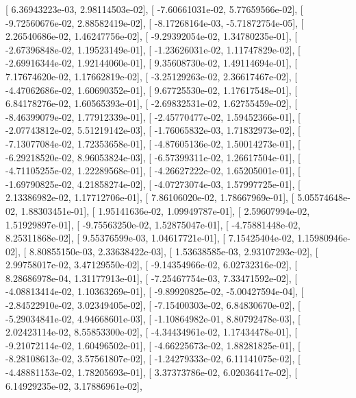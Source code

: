 \documentclass{article}
\begin{document}
       [  6.36943223e-03,   2.98114503e-02],
       [ -7.60661031e-02,   5.77659566e-02],
       [ -9.72560676e-02,   2.88582419e-02],
       [ -8.17268164e-03,  -5.71872754e-05],
       [  2.26540686e-02,   1.46247756e-02],
       [ -9.29392054e-02,   1.34780235e-01],
       [ -2.67396848e-02,   1.19523149e-01],
       [ -1.23626031e-02,   1.11747829e-02],
       [ -2.69916344e-02,   1.92144060e-01],
       [  9.35608730e-02,   1.49114694e-01],
       [  7.17674620e-02,   1.17662819e-02],
       [ -3.25129263e-02,   2.36617467e-02],
       [ -4.47062686e-02,   1.60690352e-01],
       [  9.67725530e-02,   1.17617548e-01],
       [  6.84178276e-02,   1.60565393e-01],
       [ -2.69832531e-02,   1.62755459e-02],
       [ -8.46399079e-02,   1.77912339e-01],
       [ -2.45770477e-02,   1.59452366e-01],
       [ -2.07743812e-02,   5.51219142e-03],
       [ -1.76065832e-03,   1.71832973e-02],
       [ -7.13077084e-02,   1.72353658e-01],
       [ -4.87605136e-02,   1.50014273e-01],
       [ -6.29218520e-02,   8.96053824e-03],
       [ -6.57399311e-02,   1.26617504e-01],
       [ -4.71105255e-02,   1.22289568e-01],
       [ -4.26627222e-02,   1.65205001e-01],
       [ -1.69790825e-02,   4.21858274e-02],
       [ -4.07273074e-03,   1.57997725e-01],
       [  2.13386982e-02,   1.17712706e-01],
       [  7.86106020e-02,   1.78667969e-01],
       [  5.05574648e-02,   1.88303451e-01],
       [  1.95141636e-02,   1.09949787e-01],
       [  2.59607994e-02,   1.51929897e-01],
       [ -9.75563250e-02,   1.52875047e-01],
       [ -4.75881448e-02,   8.25311868e-02],
       [  9.55376599e-03,   1.04617721e-01],
       [  7.15425404e-02,   1.15980946e-02],
       [  8.80855150e-03,   2.33638422e-03],
       [  1.53638585e-03,   2.93107293e-02],
       [  2.99758017e-02,   3.47129550e-02],
       [ -9.14354966e-02,   6.02732316e-02],
       [  8.28686978e-04,   1.31177913e-01],
       [ -7.25467754e-03,   7.33471592e-02],
       [ -4.08813414e-02,   1.10363269e-01],
       [ -9.89920825e-02,  -5.00427594e-04],
       [ -2.84522910e-02,   3.02349405e-02],
       [ -7.15400303e-02,   6.84830670e-02],
       [ -5.29034841e-02,   4.94668601e-03],
       [ -1.10864982e-01,   8.80792478e-03],
       [  2.02423114e-02,   8.55853300e-02],
       [ -4.34434961e-02,   1.17434478e-01],
       [ -9.21072114e-02,   1.60496502e-01],
       [ -4.66225673e-02,   1.88281825e-01],
       [ -8.28108613e-02,   3.57561807e-02],
       [ -1.24279333e-02,   6.11141075e-02],
       [ -4.48881153e-02,   1.78205693e-01],
       [  3.37373786e-02,   6.02036417e-02],
       [  6.14929235e-02,   3.17886961e-02],
\end{document}
